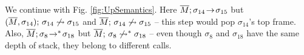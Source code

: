 We continue with  Fig. \ref{fig:UpSemantics}. Here $\overline{M};\sigma_{14}\! \rightarrow\! {\sigma_{15}}$ 
 but    $(\overline{M}, \sigma_{14});\, {\sigma_{14}} \not\rightsquigarrow \sigma_{15}$
and  $\overline{M};\, {\sigma_{14}} \not\rightsquigarrow \sigma_{15}$
--  this step would pop  $\sigma_{14}$'s
 top frame. 
 Also, $\overline{M};\sigma_8\! \rightarrow^*\! {\sigma_{18}}$ 
 but  $\overline{M};\, {\sigma_8} \not\rightsquigarrow^* \sigma_{18}$  -- even though $\sigma_8$ and $\sigma_{18}$ have the same depth of stack, they belong to different calls.
  



